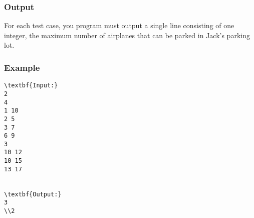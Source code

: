 \subsubsection{Output}

For each test case, you program must output a single line consisting of one integer, the maximum number of airplanes that can be parked in Jack's parking lot.

\subsubsection{Example}
\begin{verbatim}
\textbf{Input:}
2
4
1 10
2 5
3 7
6 9
3
10 12
10 15
13 17


\textbf{Output:}
3
\\2\end{verbatim}
